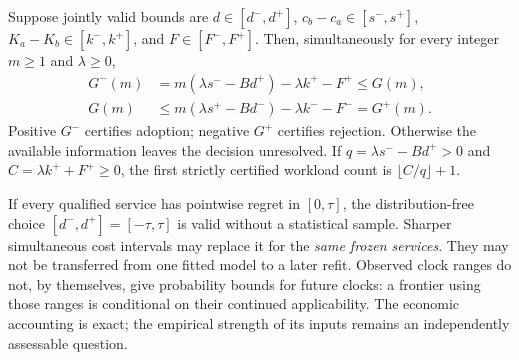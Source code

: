 \begin{theorem}\label{thm:purchase97}
Suppose jointly valid bounds are $d\in[d^-,d^+]$, $c_b-c_a\in[s^-,s^+]$, $K_a-K_b\in[k^-,k^+]$, and $F\in[F^-,F^+]$. Then, simultaneously for every integer $m\geq1$ and $\lambda\geq0$,
\begin{align}
 G^-(m)&=m(\lambda s^- -B d^+)-\lambda k^+-F^+\leq G(m),\label{eq:gainlower97}\\
 G(m)&\leq m(\lambda s^+ -B d^-)-\lambda k^- -F^-=G^+(m).\label{eq:gainupper97}
\end{align}
Positive $G^-$ certifies adoption; negative $G^+$ certifies rejection. Otherwise the available information leaves the decision unresolved. If $q=\lambda s^- -B d^+>0$ and $C=\lambda k^++F^+\geq0$, the first strictly certified workload count is $\lfloor C/q\rfloor+1$.
\end{theorem}

If every qualified service has pointwise regret in $[0,\tau]$, the distribution-free choice $[d^-,d^+]=[-\tau,\tau]$ is valid without a statistical sample. Sharper simultaneous cost intervals may replace it for the \emph{same frozen services}. They may not be transferred from one fitted model to a later refit. Observed clock ranges do not, by themselves, give probability bounds for future clocks: a frontier using those ranges is conditional on their continued applicability. The economic accounting is exact; the empirical strength of its inputs remains an independently assessable question.
